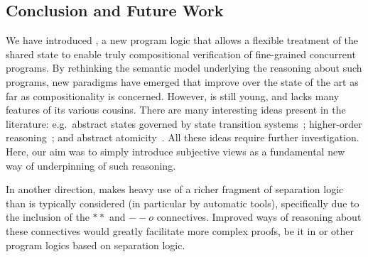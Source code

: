\subsection*{Conclusion and Future Work}

We have introduced \colosl, a new program logic that allows a flexible
treatment of the shared state to enable truly compositional
verification of fine-grained concurrent programs. By rethinking the
semantic model underlying the reasoning about such programs, new
paradigms have emerged that improve over the state of the art as far
as compositionality is concerned. However, \colosl is still young, and
lacks many features of its various cousins.  There are many
interesting ideas present in the literature: e.g.\ abstract states
governed by state transition systems~\cite{caresl}; higher-order
reasoning~\cite{icap}; and abstract atomicity~\cite{tada}. All these
ideas require further investigation. Here, our aim was to simply
introduce subjective views as a fundamental new way of underpinning of
such reasoning.

In another direction, \colosl makes heavy use of a richer fragment
of separation logic than is typically considered (in particular by
automatic tools), specifically due to the inclusion of the $**$ and
$--o$ connectives. Improved ways of reasoning about these connectives
would greatly facilitate more complex proofs, be it in \colosl or
other program logics based on separation logic.
